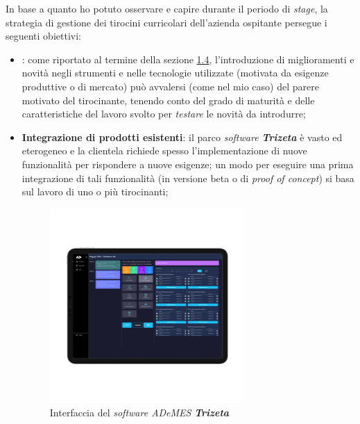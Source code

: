 In base a quanto ho potuto osservare e capire durante il periodo di \textit{stage}, la strategia di gestione dei tirocini curricolari dell'azienda ospitante persegue i seguenti obiettivi:
\begin{itemize}
    \item {}: come riportato al termine della sezione \hyperref[sec:innovazione]{1.4}, l'introduzione di miglioramenti e novità negli strumenti e nelle tecnologie utilizzate (motivata da esigenze produttive o di mercato) 
    può avvalersi (come nel mio caso) del parere motivato del tirocinante, tenendo conto del grado di maturità e delle caratteristiche del lavoro svolto per \textit{testare} le novità da introdurre;
    \item \textbf{Integrazione di prodotti esistenti}: il parco \textit{software \textbf{Trizeta}} è vasto ed eterogeneo e la clientela richiede spesso l'implementazione di nuove funzionalità per rispondere a nuove esigenze; un modo per eseguire 
        una prima integrazione di tali funzionalità (in versione beta o di \textit{proof of concept}) si basa sul lavoro di uno o più tirocinanti;
        \vspace{-20mm}
        \begin{figure}[H]
            \centering
            \includegraphics[width=0.7\textwidth]{images/ademes.png}
            \vspace{-15mm}
            \caption[Interfaccia del \textit{software ADeMES}]{Interfaccia del \textit{software ADeMES} \textit{\textbf{Trizeta}}\footnotemark}

\end{figure}
\end{itemize}
